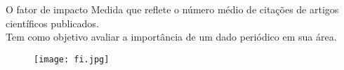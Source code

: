 \begin{frame}[t]{O fator de impacto}
    \large{Medida que reflete o número médio de citações de artigos científicos publicados.}\\

    \vspace*{0.2cm}
	Tem como objetivo avaliar a importância de um dado periódico em sua área.

    \begin{figure}
        \texttt{[image: fi.jpg]}
    \end{figure}
\end{frame}
